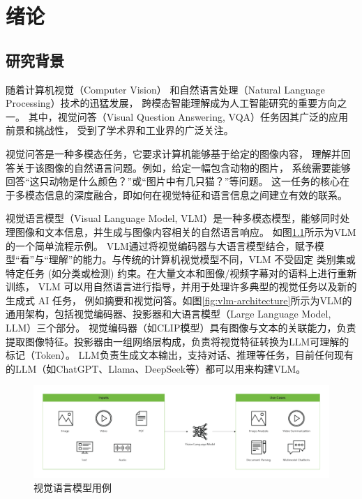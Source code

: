 \chapter{绪论}
\section{研究背景}
随着计算机视觉（Computer Vision）
和自然语言处理（Natural Language Processing）技术的迅猛发展，
跨模态智能理解成为人工智能研究的重要方向之一。
其中，视觉问答（Visual Question Answering, VQA）\cite{goyal2017making}任务因其广泛的应用前景和挑战性，
受到了学术界和工业界的广泛关注。

视觉问答是一种多模态任务，它要求计算机能够基于给定的图像内容，
理解并回答关于该图像的自然语言问题。例如，给定一幅包含动物的图片，
系统需要能够回答“这只动物是什么颜色？”或“图片中有几只猫？”等问题。
这一任务的核心在于多模态信息的深度融合，即如何在视觉特征和语言信息之间建立有效的联系。

视觉语言模型（Visual Language Model, VLM）是一种多模态模型，能够同时处理图像和文本信息，并生成与图像内容相关的自然语言响应。
如图\ref{fig:vlm-example}所示为VLM的一个简单流程示例。
VLM通过将视觉编码器与大语言模型结合，赋予模型“看”与“理解”的能力。与传统的计算机视觉模型不同，VLM 不受固定
类别集或特定任务 (如分类或检测) 约束。在大量文本和图像/视频字幕对的语料上进行重新训练，
VLM 可以用自然语言进行指导，并用于处理许多典型的视觉任务以及新的生成式 AI 任务，
例如摘要和视觉问答。如图\ref{fig:vlm-architecture}所示为VLM的通用架构，包括视觉编码器、投影器和大语言模型（Large Language Model, LLM）三个部分。
视觉编码器（如CLIP模型）具有图像与文本的关联能力，负责提取图像特征。投影器由一组网络层构成，负责将视觉特征转换为LLM可理解的标记（Token）。
LLM负责生成文本输出，支持对话、推理等任务，目前任何现有的LLM（如ChatGPT、Llama、DeepSeek等）都可以用来构建VLM。
\begin{figure}
    \centering
    \includegraphics[width=\textwidth]{figures/VLM-example.png}
    \caption{视觉语言模型用例}
    \label{fig:vlm-example}
\end{figure}

